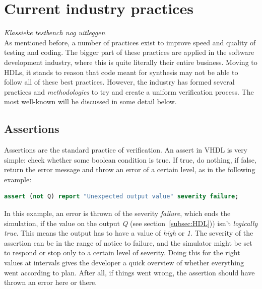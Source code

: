 \documentclass[11pt,british]{article}
\begin{document}
\section{Current industry practices}
\emph{\color{red}Klassieke testbench nog uitleggen}\\
\label{sec:industry}
As mentioned before, a number of practices exist to improve speed and quality of testing and coding. The bigger part of these practices are applied in the software development industry, where this is quite literally their entire business. Moving to \gls{HDL}s, it stands to reason that code meant for synthesis may not be able to follow all of these best practices. However, the industry has formed several practices and \emph{methodologies} to try and create a uniform verification process. The most well-known will be discussed in some detail below.

\subsection{Assertions}
\label{subsec:assertions}
Assertions are the standard practice of verification. An assert in VHDL is very simple: check whether some boolean condition is true. If true, do nothing, if false, return the error message and throw an error of a certain level, as in the following example:
\begin{lstlisting}[language=VHDL, tabsize=4, frame=single, framesep=3mm, belowskip=8pt, aboveskip=8pt, showstringspaces=false, basicstyle=\small, linewidth=\textwidth]
assert (not Q) report "Unexpected output value" severity failure;
\end{lstlisting}
In this example, an error is thrown of the severity \emph{failure}, which ends the simulation, if the value on the output \emph{Q} (see section~\ref{subsec:HDL})) isn't \emph{logically true}. This means the output has to have a value of \emph{high} or \emph{1}. The severity of the assertion can be in the range of notice to failure, and the simulator might be set to respond or stop only to a certain level of severity. Doing this for the right values at intervals gives the developer a quick overview of whether everything went according to plan. After all, if things went wrong, the assertion should have thrown an error here or there.
\end{document}
